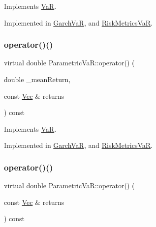 Implements \hyperlink{classVaR_a28e1a1be9e386ed4e8503e54db4033bd}{VaR}.



Implemented in \hyperlink{classGarchVaR_a6aec8c89e48d2b2f356669ed3300f456}{Garch\+VaR}, and \hyperlink{classRiskMetricsVaR_a801fc34d2327f8fffc1315a5a9aa9df1}{Risk\+Metrics\+VaR}.

\hypertarget{classParametricVaR_a5fda9d0e1033ff6e93dd112555ee5e0b}{}\label{classParametricVaR_a5fda9d0e1033ff6e93dd112555ee5e0b} 
\subsubsection{\texorpdfstring{operator()()}{operator()()}\hspace{0.1cm}{\footnotesize\ttfamily [2/3]}}
{\footnotesize\ttfamily virtual double Parametric\+Va\+R\+::operator() (\begin{DoxyParamCaption}\item[{double}]{\+\_\+mean\+Return,  }\item[{const \hyperlink{compute__returns__eigen_8h_a1eb6a9306ef406d7975f3cbf2e247777}{Vec} \&}]{returns }\end{DoxyParamCaption}) const\hspace{0.3cm}{\ttfamily [pure virtual]}}



Implements \hyperlink{classVaR_a31cb62626488715a9133679feaba31e5}{VaR}.



Implemented in \hyperlink{classGarchVaR_ab7e9583566b26a64017edbbfb63f3e89}{Garch\+VaR}, and \hyperlink{classRiskMetricsVaR_ab83bde7047dc8e501b8e8ea115cf5e7b}{Risk\+Metrics\+VaR}.

\hypertarget{classParametricVaR_aa07f1d64aff5abf484835cd9105af9c9}{}\label{classParametricVaR_aa07f1d64aff5abf484835cd9105af9c9} 
\subsubsection{\texorpdfstring{operator()()}{operator()()}\hspace{0.1cm}{\footnotesize\ttfamily [3/3]}}
{\footnotesize\ttfamily virtual double Parametric\+Va\+R\+::operator() (\begin{DoxyParamCaption}\item[{const \hyperlink{compute__returns__eigen_8h_a1eb6a9306ef406d7975f3cbf2e247777}{Vec} \&}]{returns }\end{DoxyParamCaption}) const\hspace{0.3cm}{\ttfamily [pure virtual]}}



